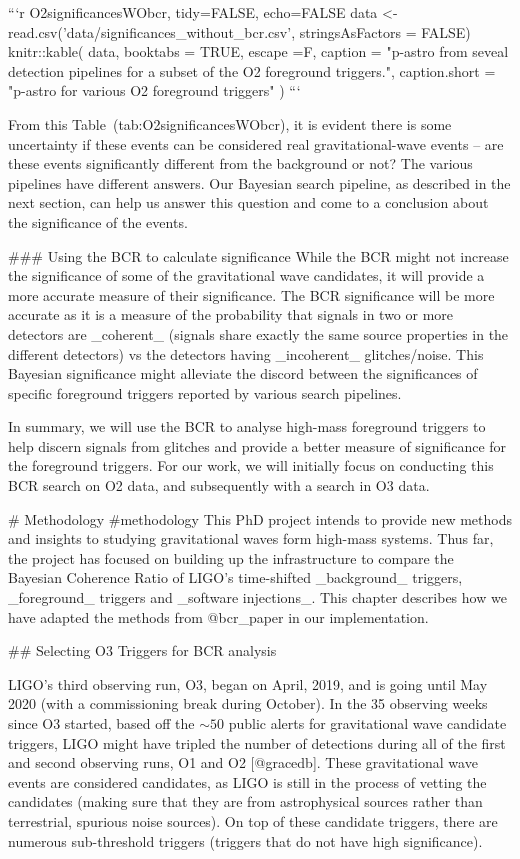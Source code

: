 {{```{r O2significancesWObcr, tidy=FALSE, echo=FALSE}
data <- read.csv('data/significances_without_bcr.csv',  stringsAsFactors = FALSE)
knitr::kable(
  data, booktabs = TRUE, escape =F, 
  caption = "p-astro from seveal detection pipelines for a subset of the O2 foreground triggers.",
  caption.short = "p-astro for various O2 foreground triggers" 
)
```

From this Table~\@ref(tab:O2significancesWObcr), it is evident there is some uncertainty if these events can be considered real
gravitational-wave events -- are these events significantly different from the background or not? The various pipelines
have different answers. Our Bayesian search pipeline, as described in the next section, can help us answer this question 
and come to a conclusion about the significance of the events.

### Using the BCR to calculate significance
While the BCR might not increase the significance of some of the gravitational wave candidates, it will provide a more
accurate measure of their significance. The BCR significance will be more accurate as it is a measure of the probability
that signals in two or more detectors are _coherent_ (signals share exactly the same source properties in the different
detectors) vs the detectors having _incoherent_ glitches/noise. This Bayesian significance might alleviate the discord
between the significances of specific foreground triggers reported by various search pipelines.

In summary, we will use the BCR to analyse high-mass foreground triggers to help discern signals from glitches and
provide a better measure of significance for the foreground triggers. For our work, we will initially focus on
conducting this BCR search on O2 data, and subsequently with a search in O3 data.



# Methodology {#methodology}
This PhD project intends to provide new methods and insights to studying gravitational waves form high-mass systems.
Thus far, the project has focused on building up the infrastructure to compare the Bayesian Coherence Ratio of LIGO's
time-shifted _background_ triggers, _foreground_ triggers and _software injections_. This chapter describes how we have
adapted the methods from @bcr_paper in our implementation.


## Selecting O3 Triggers for BCR analysis

LIGO's third observing run, O3, began on April, 2019, and is going until May 2020 (with a commissioning break during
October). In the 35 observing weeks since O3 started, based off the $\sim50$ public alerts for gravitational wave
candidate triggers, LIGO might have tripled the number of detections during all of the first and second observing runs,
O1 and O2 [@gracedb]. These gravitational wave events are considered candidates, as LIGO is still in the process of vetting the
candidates (making sure that they are from astrophysical sources rather than terrestrial, spurious noise sources). On
top of these candidate triggers, there are numerous sub-threshold triggers (triggers that do not have high
significance).

}}
